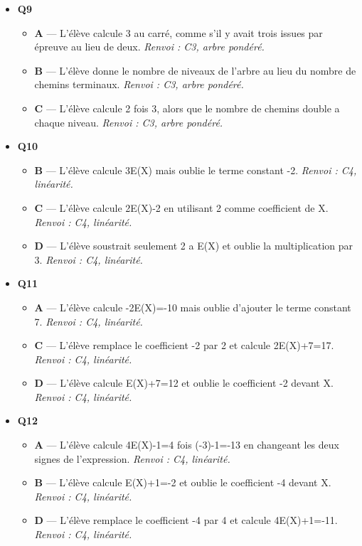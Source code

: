 \begin{itemize}
\begin{itemize}
  \end{itemize}
  \item \textbf{Q9}
  \begin{itemize}
    \item \textbf{A} — L'élève calcule 3 au carré, comme s'il y avait trois issues par épreuve au lieu de deux. \emph{Renvoi : C3, arbre pondéré.}
    \item \textbf{B} — L'élève donne le nombre de niveaux de l'arbre au lieu du nombre de chemins terminaux. \emph{Renvoi : C3, arbre pondéré.}
    \item \textbf{C} — L'élève calcule 2 fois 3, alors que le nombre de chemins double a chaque niveau. \emph{Renvoi : C3, arbre pondéré.}
  \end{itemize}
  \item \textbf{Q10}
  \begin{itemize}
    \item \textbf{B} — L'élève calcule 3E(X) mais oublie le terme constant -2. \emph{Renvoi : C4, linéarité.}
    \item \textbf{C} — L'élève calcule 2E(X)-2 en utilisant 2 comme coefficient de X. \emph{Renvoi : C4, linéarité.}
    \item \textbf{D} — L'élève soustrait seulement 2 a E(X) et oublie la multiplication par 3. \emph{Renvoi : C4, linéarité.}
  \end{itemize}
  \item \textbf{Q11}
  \begin{itemize}
    \item \textbf{A} — L'élève calcule -2E(X)=-10 mais oublie d'ajouter le terme constant 7. \emph{Renvoi : C4, linéarité.}
    \item \textbf{C} — L'élève remplace le coefficient -2 par 2 et calcule 2E(X)+7=17. \emph{Renvoi : C4, linéarité.}
    \item \textbf{D} — L'élève calcule E(X)+7=12 et oublie le coefficient -2 devant X. \emph{Renvoi : C4, linéarité.}
  \end{itemize}
  \item \textbf{Q12}
  \begin{itemize}
    \item \textbf{A} — L'élève calcule 4E(X)-1=4 fois (-3)-1=-13 en changeant les deux signes de l'expression. \emph{Renvoi : C4, linéarité.}
    \item \textbf{B} — L'élève calcule E(X)+1=-2 et oublie le coefficient -4 devant X. \emph{Renvoi : C4, linéarité.}
    \item \textbf{D} — L'élève remplace le coefficient -4 par 4 et calcule 4E(X)+1=-11. \emph{Renvoi : C4, linéarité.}

\end{itemize}
\end{itemize}
